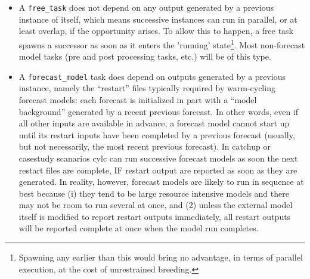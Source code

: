 \documentclass[11pt,a4paper]{article}
\begin{document}
\begin{itemize} \item A \lstinline=free_task= does not depend on any
        output generated by a previous instance of itself, which means
        successive instances can run in parallel, or at least overlap,
        if the opportunity arises. To allow this to happen, a free task
        spawns a successor as soon as it enters the 'running'
        state\footnote{Spawning any earlier than this would bring no
        advantage, in terms of parallel execution, at the cost of
        unrestrained breeding.}. Most non-forecast model tasks (pre and
        post processing tasks, etc.) will be of this type.

    \item A \lstinline=forecast_model= task does depend on outputs
        generated by a previous instance, namely the ``restart''
        files typically required by warm-cycling forecast models:
        each forecast is initialized in part with a ``model
        background'' generated by a recent previous forecast.
        In other words, even if all other inputs are available 
        in advance, a forecast model cannot start up until its
        restart inputs have been completed by a previous forecast
        (usually, but not necessarily, the most recent previous
        forecast). In catchup or casestudy scanarios cylc can run
        successive forecast models as soon the next restart files
        are complete, IF restart output are reported as soon as they are
        generated. In reality, however, forecast models are likely
        to run in sequence at best because (i) they tend to be large
        resource intensive models and there may not be room to run
        several at once, and (2) unless the external model itself 
        is modified to report restart outputs immediately, all 
        restart outputs will be reported complete at once when the
        model run completes.

\end{itemize}
\end{document}
